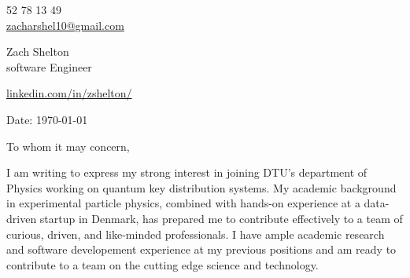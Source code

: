 \documentclass[11pt,a4]{article}
\begin{document}
\begin{center}
    \begin{minipage}[b]{0.24\textwidth}
            \large 52 78 13 49 \\
            \large \href{mailto:zacharshel10@gmail.com}{zacharshel10@gmail.com} 
    \end{minipage}%
    \begin{minipage}[b]{0.5\textwidth}
            \centering
            {\Huge Zach Shelton} \\ %
            \vspace{0.1cm}
            {\color{UI_blue} \Large{software Engineer}} \\
    \end{minipage}%
    \begin{minipage}[b]{0.24\textwidth}
            \flushright \large
            {\href{https://www.linkedin.com/in/zshelton/}{linkedin.com/in/zshelton/} } \\

    \end{minipage}   
    
\vspace{-0.15cm} 
{\color{UI_blue} \hrulefill}
\end{center}

\justify
\setlength{\parindent}{0pt}
\setlength{\parskip}{12pt}
\vspace{0.1cm}


Date: \today \par \vspace{-0.1cm}

To whom it may concern,

I am writing to express my strong interest in joining DTU's department of Physics working on quantum key distribution systems. My academic background in experimental particle physics, combined with hands-on experience at a data-driven startup in Denmark, has prepared me to contribute effectively to a team of curious, driven, and like-minded professionals. I have ample academic research and software developement experience at my previous positions and am ready to contribute to a team on the cutting edge science and technology.
\end{document}
